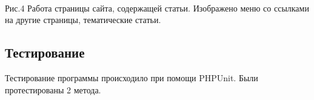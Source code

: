 \\
Рис.4  Работа страницы сайта, содержащей статьи.
Изображено меню со ссылками на другие страницы, тематические статьи.
\subsection{\normalsize Тестирование}
\hspace{1.25cm}Тестирование программы происходило при помощи PHPUnit.
Были протестированы 2 метода.

